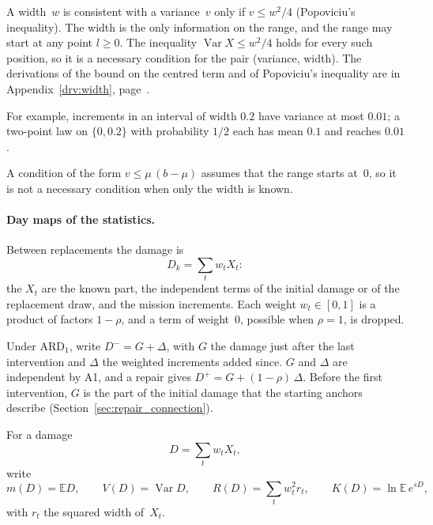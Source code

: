 \documentclass[11pt,a4paper]{article}
\theoremstyle{plain}
\theoremstyle{definition}
\theoremstyle{remark}
\begin{document}
A width~$w$ is consistent with a variance~$v$ only if $v \le w^2/4$ (Popoviciu's inequality).
The width is the only information on the range, and the range may start at any point $l \ge 0$.
The inequality $\operatorname{Var} X \le w^2/4$ holds for every such position, so it is a necessary condition for the pair (variance, width).
The derivations of the bound on the centred term and of Popoviciu's inequality are in Appendix~\ref{drv:width}, page~\pageref{drv:width}.

For example, increments in an interval of width $0.2$ have variance at most $0.01$; a two-point law on $\{0, 0.2\}$ with probability $1/2$ each has mean $0.1$ and reaches $0.01$.

A condition of the form $v \le \mu\,(b - \mu)$ assumes that the range starts at~$0$, so it is not a necessary condition when only the width is known.

\paragraph{Day maps of the statistics.}
Between replacements the damage is
\begin{equation}
  D_k = \sum_t w_t X_t:
\end{equation}
the $X_t$ are the known part, the independent terms of the initial damage or of the replacement draw, and the mission increments.
Each weight $w_t \in [0, 1]$ is a product of factors $1 - \rho$, and a term of weight~$0$, possible when $\rho = 1$, is dropped.

Under $\text{ARD}_1$, write $D^- = G + \Delta$, with $G$ the damage just after the last intervention and $\Delta$ the weighted increments added since.
$G$ and $\Delta$ are independent by A1, and a repair gives $D^+ = G + (1-\rho)\,\Delta$.
Before the first intervention, $G$ is the part of the initial damage that the starting anchors describe (Section~\ref{sec:repair_connection}).

For a damage
\begin{equation}
  D = \sum_t w_t X_t,
\end{equation}
write
\begin{equation}
  m(D) = \mathbb{E}D, \qquad V(D) = \operatorname{Var} D, \qquad R(D) = \sum_t w_t^2 r_t, \qquad K(D) = \ln\mathbb{E}\,e^{sD},
\end{equation}
with $r_t$ the squared width of~$X_t$.
\end{document}
